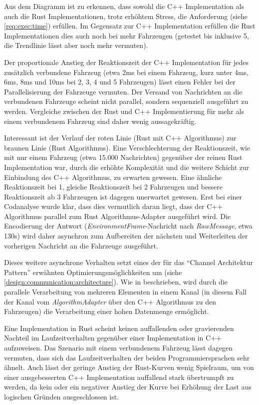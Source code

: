 Aus dem Diagramm ist zu erkennen, dass sowohl die C++ Implementation als auch die Rust Implementationen, trotz erhöhtem Stress, die Anforderung  (siehe \autoref{req:exec:time}) erfüllen.
Im Gegensatz zur C++ Implementation erfüllen die Rust Implementationen dies auch noch bei mehr Fahrzeugen (getestet bis inklusive 5, die Trendlinie lässt aber noch mehr vermuten).

Der proportionale Anstieg der Reaktionszeit der C++ Implementation für jedes zusätzlich verbundene Fahrzeug (etwa 2ms bei einem Fahrzeug, kurz unter 4ms, 6ms, 8ms und 10ms bei 2, 3, 4 und 5 Fahrzeugen) lässt einen Fehler bei der Parallelisierung der Fahrzeuge vermuten.
Der Versand von Nachrichten an die verbundenen Fahrzeuge scheint nicht parallel, sondern sequenziell ausgeführt zu werden.
Vergleiche zwischen der Rust und C++ Implementierung für mehr als einem verbundenem Fahrzeug sind daher wenig aussagekräftig.

Interessant ist der Verlauf der roten Linie (Rust mit C++ Algorithmus) zur braunen Linie (Rust Algorithmus).
Eine Verschlechterung der Reaktionszeit, wie mit nur einem Fahrzeug (etwa 15.000 Nachrichten) gegenüber der reinen Rust Implementation war, durch die erhöhte Komplexität und die weitere Schicht zur Einbindung des C++ Algorithmus, zu erwarten gewesen.
Eine ähnliche Reaktionszeit bei 1, gleiche Reaktionszeit bei 2 Fahrzeugen und bessere Reaktionszeit ab 3 Fahrzeugen ist dagegen unerwartet gewesen.
Erst bei einer Codanalyse wurde klar, dass dies vermutlich daran liegt, dass der C++ Algorithmus parallel zum Rust Algorithmus-Adapter ausgeführt wird.
Die Encodierung der Antwort (\textit{EnvironmentFrame}-Nachricht nach \textit{RawMessage}, etwa 130\textmu s) wird daher asynchron zum Aufbereiten der nächsten und Weiterleiten der vorherigen Nachricht an die Fahrzeuge ausgeführt.

Dieses weitere asynchrone Verhalten setzt eines der für das \enquote{Channel Architektur Pattern} erwähnten Optimierungsmöglichkeiten um (siehe \autoref{design:communication:architecture}).
Wie in \cite[160]{douglass2003real} beschrieben, wird durch die parallele Verarbeitung von mehreren Elementen in einem Kanal (in diesem Fall der Kanal vom \textit{AlgorithmAdapter} über den C++ Algorithmus zu den Fahrzeugen) die Verarbeitung einer hohen Datenmenge ermöglicht.

Eine Implementation in Rust scheint keinen auffallenden oder gravierenden Nachteil im Laufzeitverhalten gegenüber einer Implementation in C++ aufzuweisen.
Das Szenario mit einem verbundenem Fahrzeug lässt dagegen vermuten, dass sich das Laufzeitverhalten der beiden Programmiersprachen sehr ähnelt.
Auch lässt der geringe Anstieg der Rust-Kurven wenig Spielraum, um von einer ausgebesserten C++ Implementation auffallend stark übertrumpft zu werden, da
kein oder ein negativer Anstieg der Kurve bei Erhöhung der Last aus logischen Gründen ausgeschlossen ist.


